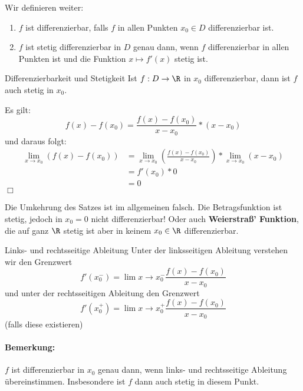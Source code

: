 Wir definieren weiter:
\begin{definition}{}\vspace*{-1em}\begin{enumerate}
		\item $f$ ist differenzierbar, falls $f$ in allen Punkten $x_0\in D$ differenzierbar ist.
		\item $f$ ist stetig differenzierbar in $D$ genau dann, wenn $f$ differenzierbar in allen Punkten ist und die Funktion $x\mapsto f'(x)$ stetig ist.
	\end{enumerate}
\end{definition}
\begin{satz}{Differenzierbarkeit und Stetigkeit}
	Ist $f:D\rightarrow\R$ in $x_0$ differenzierbar, dann ist $f$ auch stetig in $x_0$.
\end{satz}
\beweis
Es gilt:
\begin{equation*}
	f(x)-f(x_0)=\frac{f(x)-f(x_0)}{x-x_0}*(x-x_0)
\end{equation*}
und daraus folgt:
\begin{align*}
	\lim\limits_{x\to x_0}(f(x)-f(x_0)) &= \lim\limits_{x\to x_0}\left(\frac{f(x)-f(x_0)}{x-x_0}\right)*\lim\limits_{x\to x_0}(x-x_0)\\
	&=f'(x_0)*0\\
	&=0
\end{align*}
\hfill$\Box$

Die Umkehrung des Satzes ist im allgemeinen falsch. Die Betragsfunktion ist stetig, jedoch in $x_0=0$ nicht differenzierbar!
Oder auch \textbf{Weierstraß' Funktion}, die auf ganz $\R$ stetig ist aber in keinem $x_0\in\R$ differenzierbar.

\begin{definition}{Links- und rechtsseitige Ableitung}
	Unter der linksseitigen Ableitung verstehen wir den Grenzwert
	\begin{equation*}
		f'(x_0^-)=\lim\limits{x\to x_0^-}\frac{f(x)-f(x_0)}{x-x_0}
	\end{equation*}
	und unter der rechtsseitigen Ableitung den Grenzwert
	\begin{equation*}
		f'(x_0^+)=\lim\limits{x\to x_0^+}\frac{f(x)-f(x_0)}{x-x_0}
	\end{equation*}
	(falls diese existieren)
\end{definition}
\paragraph{Bemerkung:}
$f$ ist differenzierbar in $x_0$ genau dann, wenn links- und rechtsseitige Ableitung übereinstimmen. Insbesondere ist $f$ dann auch stetig in diesem Punkt.

